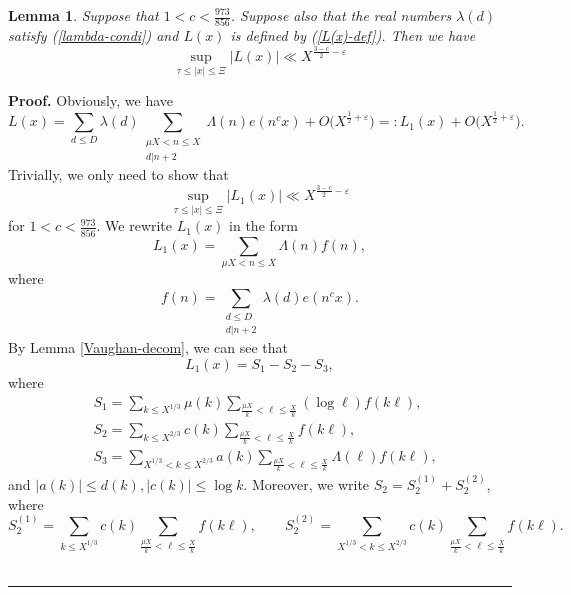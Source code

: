 \documentclass[a4paper,oneside,11pt]{article}%
\newtheorem{lemma}[theorem]{Lemma}
\newenvironment{proof}[1][Proof]{\noindent \textbf{#1.} }{\  \rule{0.5em}{0.5em}}
\numberwithin{equation}{section}
\begin{document}
\begin{lemma}\label{Expo-esti}
Suppose that $1<c<\frac{973}{856}$. Suppose also that the real numbers $\lambda(d)$ satisfy (\ref{lambda-condi}) and $L(x)$
is defined by (\ref{L(x)-def}). Then we have
\begin{equation*}
  \sup_{\tau\leqslant|x|\leqslant\Xi}\big|L(x)\big|\ll X^{\frac{3-c}{2}-\varepsilon}
\end{equation*}
\end{lemma}
\begin{proof}
Obviously, we have
\begin{equation*}
  L(x)=\sum_{d\leqslant D}\lambda(d)\sum_{\substack{\mu X<n\leqslant X\\ d|n+2}}\Lambda(n)e(n^cx)+O\big(X^{\frac{1}{2}+\varepsilon}\big)=:L_1(x)+O\big(X^{\frac{1}{2}+\varepsilon}\big).
\end{equation*}
Trivially, we only need to show that
\begin{equation*}
  \sup_{\tau\leqslant|x|\leqslant\Xi}\big|L_1(x)\big|\ll X^{\frac{3-c}{2}-\varepsilon}
\end{equation*}
for $1<c<\frac{973}{856}$. We rewrite $L_1(x)$ in the form
\begin{equation*}
  L_1(x)=\sum_{\mu X<n\leqslant X}\Lambda(n)f(n),
\end{equation*}
where
\begin{equation*}
 f(n)=\sum_{\substack{d\leqslant D\\ d|n+2}}\lambda(d)e(n^cx).
\end{equation*}
By Lemma \ref{Vaughan-decom}, we can see that
\begin{equation*}
 L_1(x)=S_1-S_2-S_3,
\end{equation*}
where
\begin{align*}
   & S_1=\sum_{k\leqslant X^{1/3}}\mu(k)\sum_{\frac{\mu X}{k}<\ell\leqslant\frac{X}{k}}(\log\ell)f(k\ell),    \\
   & S_2=\sum_{k\leqslant X^{2/3}}c(k)\sum_{\frac{\mu X}{k}<\ell\leqslant\frac{X}{k}}f(k\ell),    \\
   & S_3=\sum_{X^{1/3}<k\leqslant X^{2/3}}a(k)\sum_{\frac{\mu X}{k}<\ell\leqslant\frac{X}{k}}\Lambda(\ell)f(k\ell),
\end{align*}
and $|a(k)|\leqslant d(k),|c(k)|\leqslant\log k$. Moreover, we write $S_2=S_2^{(1)}+S_2^{(2)}$, where
\begin{equation*}
 S_2^{(1)}=\sum_{k\leqslant X^{1/3}}c(k)\sum_{\frac{\mu X}{k}<\ell\leqslant\frac{X}{k}}f(k\ell),\qquad
 S_2^{(2)}=\sum_{X^{1/3}<k\leqslant X^{2/3}}c(k)\sum_{\frac{\mu X}{k}<\ell\leqslant\frac{X}{k}}f(k\ell).

\end{equation*}
\end{proof}
\end{document}
